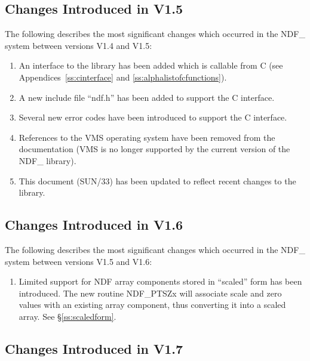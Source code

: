 \documentclass[twoside,11pt]{article}
\newcommand{\xref}[3]{#1}
\begin{document}
\subsection{Changes Introduced in V1.5}

The following describes the most significant changes which occurred in
the NDF\_ system between versions V1.4 and V1.5:

\begin{enumerate}
\item An interface to the library has been added which is callable
from C (see Appendices~\ref{ss:cinterface} and
\ref{ss:alphalistofcfunctions}).

\item A new include file ``ndf.h'' has been added to support the
C interface.

\item Several new error codes have been introduced to support the C
interface.

\item References to the VMS operating system have been removed from
the documentation (VMS is no longer supported by the current version
of the NDF\_ library).

\item This document (\xref{SUN/33}{sun33}{}) has been updated to
reflect recent changes to the library.
\end{enumerate}

\subsection{Changes Introduced in V1.6}

The following describes the most significant changes which occurred in
the NDF\_ system between versions V1.5 and V1.6:

\begin{enumerate}
\item Limited support for NDF array components stored in ``scaled'' form
has been introduced. The new routine NDF\_PTSZx will associate scale and
zero values with an existing array component, thus converting it into a
scaled array. See \S\ref{ss:scaledform}.

\end{enumerate}

\subsection{Changes Introduced in V1.7}
\end{document}
